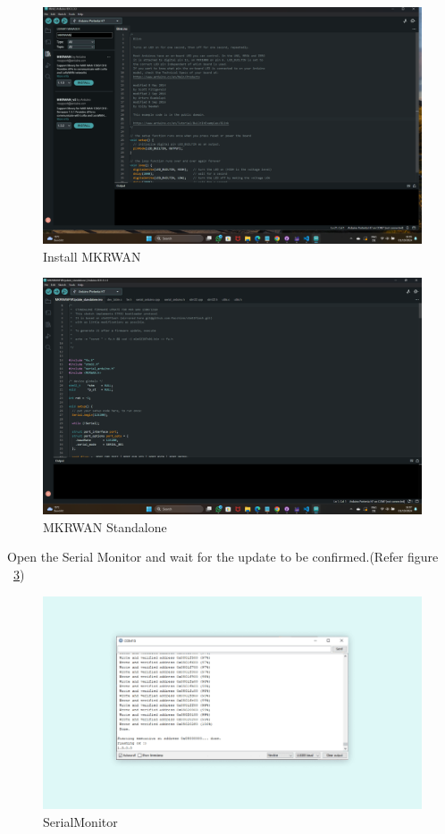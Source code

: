 \begin{itemize}
\begin{figure}
	\begin{center}
		\includegraphics[width=0.7\linewidth]{Images/LORA/InstallMKRWAN.png}
		\caption{Install MKRWAN}
		\label{Install MKRWAN}
	\end{center}
\end{figure}

\begin{figure}
	\begin{center}
		\includegraphics[width=0.7\linewidth]{Images/LORA/MKRWANStandalone.png}
		\caption{MKRWAN Standalone}
		\label{MKRWAN Standalone}
	\end{center}
\end{figure}

Open the Serial Monitor and wait for the update to be confirmed.(Refer figure ~\ref{SerialMonitor})

\begin{figure}
	\begin{center}
		\includegraphics[width=0.7\linewidth]{Images/LORA/SerialMonitor.png}
		\caption{SerialMonitor}
		\label{SerialMonitor}
	\end{center}
\end{figure}




\end{itemize}
